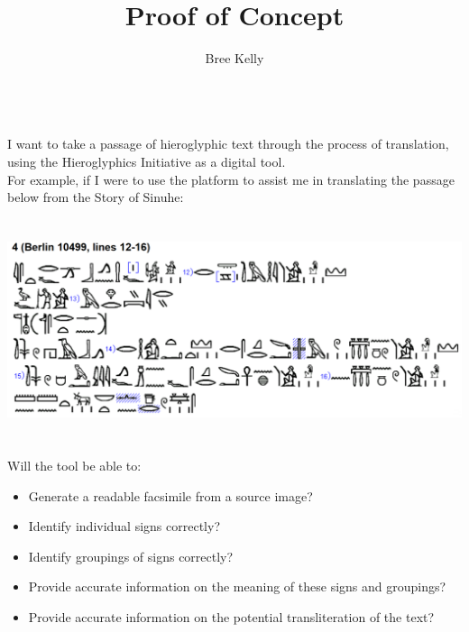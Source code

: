 \documentclass{article}
\begin{document}
\Large{\title{\textbf{Proof of Concept}}}
\author{Bree Kelly} \date{}

\maketitle

\paragraph{} ~\\ \large
{}
\newline \break
I want to take a passage of hieroglyphic text through the process of translation, using the Hieroglyphics Initiative as a digital tool.
\newline ~\\
For example, if I were to use the platform to assist me in translating the passage below from the Story of Sinuhe:
\paragraph{}~\\
\includegraphics[width=1.0\textwidth]{hiero_1.PNG}
\paragraph{}~\\
Will the tool be able to:
\newline ~\\
\begin{itemize}  
\item Generate a readable facsimile from a source image?
\item Identify individual signs correctly?
\item Identify groupings of signs correctly?
\item Provide accurate information on the meaning of these signs and groupings?
\item Provide accurate information on the potential transliteration of the text?
\end{itemize}
\end{document}

